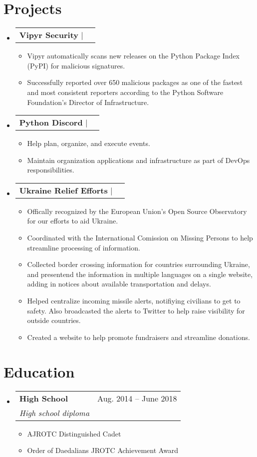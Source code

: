 \documentclass[letterpaper,11pt]{article}
\makeatletter
\let\emph\relax
\newcommand{\resumeItem}[1]{
  \item\small{
    {#1 \vspace{-2pt}}
  }
}
\newcommand{\resumeSubheading}[4]{
  \vspace{-2pt}\item
    \begin{tabular*}{0.97\textwidth}[t]{l@{\extracolsep{\fill}}r}
      \textbf{#1} & #2 \\
      \textit{\small#3} & \textit{\small #4} \\
    \end{tabular*}\vspace{-7pt}
}
\newcommand{\resumeProjectHeading}[2]{
    \item
    \begin{tabular*}{0.97\textwidth}{l@{\extracolsep{\fill}}r}
      \small#1 & #2 \\
    \end{tabular*}\vspace{-7pt}
}
\newcommand{\resumeSubheadingListStart}{\begin{itemize}[leftmargin=0.15in, label={}]}
\newcommand{\resumeSubheadingListEnd}{\end{itemize}}
\newcommand{\resumeItemListStart}{\begin{itemize}}
\newcommand{\resumeItemListEnd}{\end{itemize}}
\makeatother
\begin{document}
\section{Projects}
    \resumeSubheadingListStart
        \resumeProjectHeading{\textbf{Vipyr Security} $|$ \emph{Python, GitHub Actions, Kubernetes, Sentry}}{}
        \resumeItemListStart
            \resumeItem{Vipyr automatically scans new releases on the Python Package Index (PyPI) for malicious signatures.}
            \resumeItem{Successfully reported over 650 malicious packages as
            one of the fastest and most consistent reporters according to the
        Python Software Foundation's Director of Infrastructure.}
        \resumeItemListEnd
    \resumeSubheadingListEnd
    \resumeSubheadingListStart
        \resumeProjectHeading{\textbf{Python Discord} $|$ \emph{Python, GitHub Actions, Kubernetes, Sentry}}{}
        \resumeItemListStart
            \resumeItem{Help plan, organize, and execute events.}
            \resumeItem{Maintain organization applications and infrastructure as part of DevOps responsibilities.}
        \resumeItemListEnd
    \resumeSubheadingListEnd
    \resumeSubheadingListStart
        \resumeProjectHeading{\textbf{Ukraine Relief Efforts} $|$ \emph{GitHub Actions, Vercel, Sentry}}{}
        \resumeItemListStart
            \resumeItem{Offically recognized by the European Union's Open Source Observatory for 
              our efforts to aid Ukraine.}
            \resumeItem{Coordinated with the International Comission on Missing Persons to help
              streamline processing of information.}
            \resumeItem{Collected border crossing information for countries surrounding Ukraine, 
              and presentend the information in multiple languages on a single website, 
              adding in notices about available transportation and delays.}
            \resumeItem{Helped centralize incoming missile alerts, notifiying civilians to get to safety. 
              Also broadcasted the alerts to Twitter to help raise visibility for outside countries.}
            \resumeItem{Created a website to help promote fundraisers and streamline donations.}
        \resumeItemListEnd
    \resumeSubheadingListEnd

  \section{Education}
  \resumeSubheadingListStart
    \resumeSubheading{High School}{Aug. 2014 -- June 2018}{High school diploma}{}
    \resumeItemListStart
        \resumeItem{AJROTC Distinguished Cadet}
        \resumeItem{Order of Daedalians JROTC Achievement Award}
    \resumeItemListEnd
  \resumeSubheadingListEnd
\end{document}

